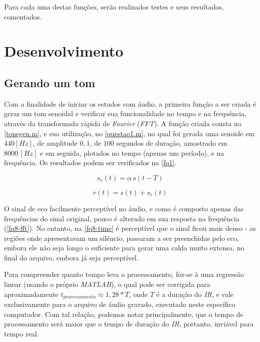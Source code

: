 \documentclass[
	12pt,				%
	article,			%
	openright,			%
	oneside,
	a4paper,			%
	chapter=TITLE,		%
	section=TITLE,		%
	english,			%
	french,				%
	spanish,			%
	brazil,				%
]{abntex2}
\begin{document}
	Para cada uma destas funções, serão realizados testes e seus resultados, comentados.
	
	\section[Desenvolvimento]{Desenvolvimento}
	
	\subsection{Gerando um tom}
	
	Com a finalidade de iniciar os estudos com áudio, a primeira função a ser criada é gerar um tom senoidal e verificar sua funcionalidade no tempo e na frequência, através da transformada rápida de \textit{Fourier} (\textit{FFT}). A função criada consta no \autoref{tonegen.m}, e sua utilização, no \autoref{questao1.m}, no qual foi gerada uma senoide em $440 [Hz]$, de amplitude $0,1$, de $100$ segundos de duração, amostrado em $8000\,[Hz]$ e em seguida, plotados no tempo (apenas um período), e na frequência. Os resultados podem ser verificados na \autoref{fq1}.
	
	\begin{equation}
	\label{eq-eco1}
	s_e(t)=\alpha\,s(t -T)
	\end{equation}
	
	\begin{equation}
	\label{eq-eco2}
	r(t)=s(t)+s_e(t)
	\end{equation}
	
	O sinal de eco facilmente perceptível no áudio, e como é composto apenas das frequências do sinal original, pouco é alterado em sua resposta na frequência (\autoref{fq8-fft}). No entanto, na \autoref{fq8-time} é perceptível que o sinal ficou mais denso - as regiões onde apresentavam um silêncio, passaram a ser preenchidas pelo eco, embora ele não seja longo o suficiente para gerar uma calda muito extensa, no final do arquivo, embora já seja perceptível.
	
		
	
	Para compreender quanto tempo leva o processamento, fez-se à uma regressão linear (usando o próprio \textit{MATLAB}), o qual pode ser corrigida para aproximadamente $t_{processamento} \approx 1,28*T$, onde $T$ é a duração do \textit{IR}, e vale exclusivamente para o arquivo de áudio gravado, executado neste específico computador. Com tal relação, podemos notar principalmente, que o tempo de processamento será maior que o tempo de duração do \textit{IR}, portanto, inviável para tempo real.
		
\end{document}
